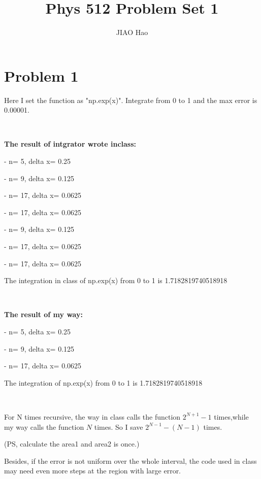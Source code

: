 \documentclass[showpacs, oneside, onecolumn, prl, amsmath, amssymb, nofootinbib, superscriptaddress, notitlepage]{revtex4-1}
\begin{document}
	
\title{Phys 512 Problem Set 1}


\author{JIAO Hao}

\maketitle



\section{Problem 1}

Here I set the function as "np.exp(x)". Integrate from 0 to 1 and the max error is 0.00001.

~

\textbf{The result of intgrator wrote inclass:}

- n= 5,	 	 delta x= 0.25

- n= 9,	 	 delta x= 0.125

- n= 17, 	 delta x= 0.0625

- n= 17, 	 delta x= 0.0625

- n= 9,		 delta x= 0.125

- n= 17, 	 delta x= 0.0625

- n= 17, 	 delta x= 0.0625

The integration in class of np.exp(x) from 0 to 1 is 1.7182819740518918 

~

\textbf{The result of my way:}

- n= 5, 	 delta x= 0.25

- n= 9, 	 delta x= 0.125

- n= 17, 	 delta x= 0.0625

The integration of np.exp(x) from 0 to 1 is 1.7182819740518918 

~

For N times recursive, the way in class calls the function $2^{N+1}-1$ times,while my way calls the function $N$ times. So I save $2^{N-1}-(N-1)$ times.

(PS, calculate the area1 and area2 is once.)

Besides, if the error is not uniform over the whole interval, the code used in class may need even more steps at the region with large error.


~~~~

\end{document}
